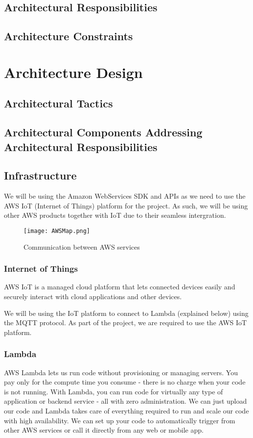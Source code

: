 \documentclass{article}
\begin{document}
\subsection{Architectural Responsibilities}
\subsection{Architecture Constraints}

\cleardoublepage

\section{Architecture Design}
\subsection{Architectural Tactics}
\subsection{Architectural Components Addressing Architectural Responsibilities}
\subsection{Infrastructure}
	We will be using the Amazon WebServices SDK and APIs as we need to use the AWS IoT (Internet of Things) platform for the project. As such, we will be using other AWS products together with IoT due to their seamless intergration.
		\begin{figure}[H]
			\centering
			\texttt{[image: AWSMap.png]}
			\caption{Communication between AWS services}
		\end{figure}
	\subsubsection{Internet of Things}
		AWS IoT is a managed cloud platform that lets connected devices easily and securely interact with cloud applications and other devices.
		
		We will be using the IoT platform to connect to Lambda (explained below) using the MQTT protocol. As part of the project, we are required to use the AWS IoT platform.
	\subsubsection{Lambda}
		AWS Lambda lets us run code without provisioning or managing servers. You pay only for the compute time you consume - there is no charge when your code is not running. With Lambda, you can run code for virtually any type of application or backend service - all with zero administration. We can just upload our code and Lambda takes care of everything required to run and scale our code with high availability. We can set up your code to automatically trigger from other AWS services or call it directly from any web or mobile app.
		
\end{document}
